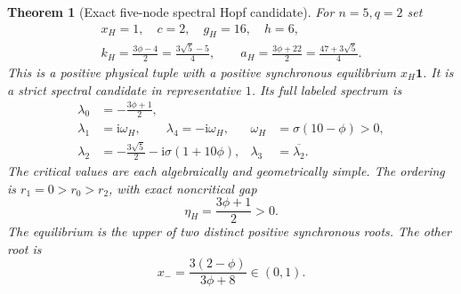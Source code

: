 \documentclass[11pt]{article}
\newcommand{\one}{\mathbf{1}}
\newcommand{\ii}{\mathrm{i}}
\newtheorem{theorem}{Theorem}[section]
\theoremstyle{definition}
\theoremstyle{remark}
\begin{document}
\begin{theorem}[Exact five-node spectral Hopf candidate]
\label{thm:P11-five}
For $n=5,q=2$ set
\begin{equation}
 \begin{gathered}
 x_H=1,\quad c=2,\quad g_H=16,\quad h=6,\\
 k_H=\frac{3\phi-4}{2}=\frac{3\sqrt5-5}{4},\qquad
 a_H=\frac{3\phi+22}{2}=\frac{47+3\sqrt5}{4}.
 \end{gathered}
 \label{eq:P11-tuple}
\end{equation}
This is a positive physical tuple with a positive synchronous equilibrium
$x_H\one$. It is a strict spectral candidate in representative $1$.
Its full labeled spectrum is
\begin{align}
 \lambda_0&=-\frac{3\phi+1}{2},\label{eq:P11-five-spectrum}\\
 \lambda_1&=\ii\omega_H,\qquad \lambda_4=-\ii\omega_H,
       &\omega_H&=\sigma(10-\phi)>0,\nonumber\\
 \lambda_2&=-\frac{3\sqrt5}{2}-\ii\sigma(1+10\phi),
       &\lambda_3&=\overline{\lambda_2}.\nonumber
\end{align}
The critical values are each algebraically and geometrically simple.
The ordering is $r_1=0>r_0>r_2$, with exact noncritical gap
\begin{equation}
 \eta_H=\frac{3\phi+1}{2}>0.
 \label{eq:P11-five-gap}
\end{equation}
The equilibrium is the upper of two distinct positive synchronous roots.
The other root is
\begin{equation}
 x_- =\frac{3(2-\phi)}{3\phi+8}\in(0,1).
 \label{eq:P11-lower-root}
\end{equation}
\end{theorem}
\end{document}
